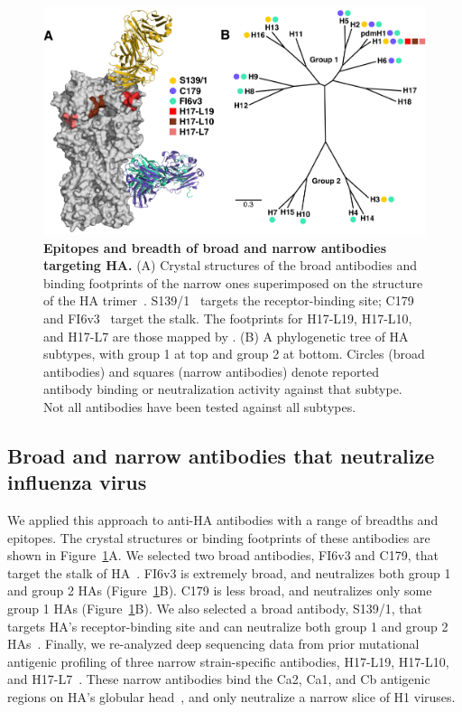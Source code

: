 \documentclass[11pt]{article}
\begin{document}
\begin{figure}
\centerline{\includegraphics[width=\textwidth]{figs/antibody_summary_fig/Ab_summary.pdf}}
\caption{\label{fig:antibody_summary}
{\bf Epitopes and breadth of broad and narrow antibodies targeting HA.}
(A) Crystal structures of the broad antibodies and binding footprints of the narrow ones superimposed on the structure of the HA trimer~\citep[PDB 1RVX;][]{gamblin2004structure}. 
S139/1~\citep[PDB 4GMS;][]{lee2012heterosubtypic} targets the receptor-binding site; C179~\citep[PDB 4HLZ;][]{dreyfus2013structure} and FI6v3~\citep[PDB 3ZTN;][]{corti2011neutralizing} target the stalk. 
The footprints for H17-L19, H17-L10, and H17-L7 are those mapped by \citet{doud2017complete}. 
(B) A phylogenetic tree of HA subtypes, with group 1 at top and group 2 at bottom.
Circles (broad antibodies) and squares (narrow antibodies) denote reported antibody binding or neutralization activity against that subtype. 
Not all antibodies have been tested against all subtypes. 
}
\end{figure}

\subsection*{Broad and narrow antibodies that neutralize influenza virus}
We applied this approach to anti-HA antibodies with a range of breadths and epitopes.
The crystal structures or binding footprints of these antibodies are shown in Figure~\ref{fig:antibody_summary}A.
We selected two broad antibodies, FI6v3 and C179, that target the stalk of HA~\citep{corti2011neutralizing, okuno1993common, dreyfus2013structure}. 
FI6v3 is extremely broad, and neutralizes both group 1 and group 2 HAs (Figure~\ref{fig:antibody_summary}B).
C179 is less broad, and neutralizes only some group 1 HAs (Figure~\ref{fig:antibody_summary}B).
We also selected a broad antibody, S139/1, that targets HA's receptor-binding site and can neutralize both group 1 and group 2 HAs~\citep{yoshida2009cross, lee2012heterosubtypic}.
Finally, we re-analyzed deep sequencing data from prior mutational antigenic profiling of three narrow strain-specific antibodies, H17-L19, H17-L10, and H17-L7~\citep{doud2017complete}.
These narrow antibodies bind the Ca2, Ca1, and Cb antigenic regions on HA's globular head~\citep{caton1982antigenic}, and only neutralize a narrow slice of H1 viruses.
\end{document}
